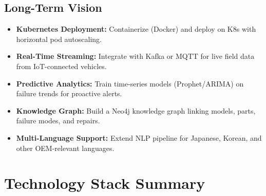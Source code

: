 \documentclass[12pt, a4paper, twoside]{article}
\begin{document}
\subsection{Long-Term Vision}

\begin{itemize}[leftmargin=*, itemsep=4pt]
  \item \textbf{Kubernetes Deployment:} Containerize (Docker) and deploy on K8s with horizontal pod autoscaling.
  \item \textbf{Real-Time Streaming:} Integrate with Kafka or MQTT for live field data from IoT-connected vehicles.
  \item \textbf{Predictive Analytics:} Train time-series models (Prophet/ARIMA) on failure trends for proactive alerts.
  \item \textbf{Knowledge Graph:} Build a Neo4j knowledge graph linking models, parts, failure modes, and repairs.
  \item \textbf{Multi-Language Support:} Extend NLP pipeline for Japanese, Korean, and other OEM-relevant languages.
\end{itemize}

\newpage

\section{Technology Stack Summary}
\end{document}
